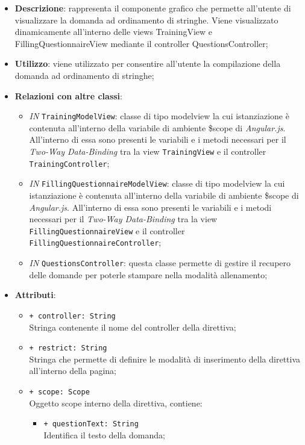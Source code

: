 		\begin{itemize}
			\item \textbf{Descrizione}: rappresenta il componente grafico che permette all'utente di visualizzare la domanda ad ordinamento di stringhe. Viene visualizzato dinamicamente all'interno delle views TrainingView e FillingQuestionnaireView mediante il controller QuestionsController;
			\item \textbf{Utilizzo}: viene utilizzato per consentire all'utente la compilazione della domanda ad ordinamento di stringhe;
			\item \textbf{Relazioni con altre classi}: 
			\begin{itemize}
				\item \textit{IN} \texttt{TrainingModelView}: classe di tipo modelview la cui istanziazione è contenuta all'interno della variabile di ambiente \$scope di \textit{Angular.js}. All'interno di essa sono presenti le variabili e i metodi necessari per il \textit{Two-Way Data-Binding} tra la view \texttt{TrainingView} e il controller \texttt{TrainingController}; 
				\item \textit{IN} \texttt{FillingQuestionnaireModelView}: classe di tipo modelview la cui istanziazione è contenuta all'interno della variabile di ambiente \$scope di \textit{Angular.js}. All'interno di essa sono presenti le variabili e i metodi necessari per il \textit{Two-Way Data-Binding} tra la view \texttt{FillingQuestionnaireView} e il controller \texttt{FillingQuestionnaireController};
				\item \textit{IN} \texttt{QuestionsController}: questa classe permette di gestire il recupero delle domande per poterle stampare nella modalità allenamento;
			\end{itemize}
			\item \textbf{Attributi}: 
			\begin{itemize}
				\item \texttt{+ controller: String} \\ Stringa contenente il nome del controller della direttiva;
				\item \texttt{+ restrict: String} \\ Stringa che permette di definire le modalità di inserimento della direttiva all'interno della pagina;
				\item \texttt{+ scope: Scope} \\ Oggetto scope interno della direttiva, contiene:
				\begin{itemize}
					\item \texttt{+ questionText: String} \\ Identifica il testo della domanda;

\end{itemize}
\end{itemize}
\end{itemize}
